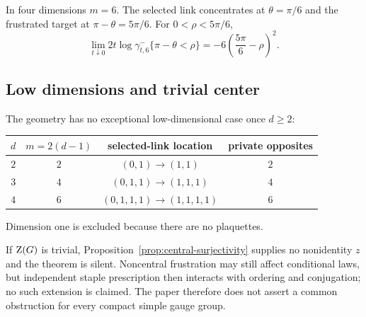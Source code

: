 In four dimensions $m=6$.  The selected link concentrates at $\theta=\pi/6$
and the frustrated target at $\pi-\theta=5\pi/6$.  For
$0<\rho<5\pi/6$,
\begin{equation}\label{eq:su2-four-dimensional-rate}
 \lim_{t\downarrow0}2t\log\gamma_{t,6}^{-}
 \{\pi-\theta<\rho\}
 =-6\left(\frac{5\pi}{6}-\rho\right)^2.
\end{equation}

\subsection{Low dimensions and trivial center}

The geometry has no exceptional low-dimensional case once $d\geq2$:
\begin{center}
\begin{tabular}{@{}cccc@{}}
\toprule
$d$ & $m=2(d-1)$ & selected-link location & private opposites \\
\midrule
$2$ & $2$ & $(0,1)\to(1,1)$ & $2$ \\
$3$ & $4$ & $(0,1,1)\to(1,1,1)$ & $4$ \\
$4$ & $6$ & $(0,1,1,1)\to(1,1,1,1)$ & $6$ \\
\bottomrule
\end{tabular}
\end{center}
Dimension one is excluded because there are no plaquettes.

If $\mathrm Z(G)$ is trivial, Proposition~\ref{prop:central-surjectivity} supplies
no nonidentity $z$ and the theorem is silent.  Noncentral frustration may
still affect conditional laws, but independent staple prescription then
interacts with ordering and conjugation; no such extension is claimed.  The
paper therefore does not assert a common obstruction for every compact
simple gauge group.
